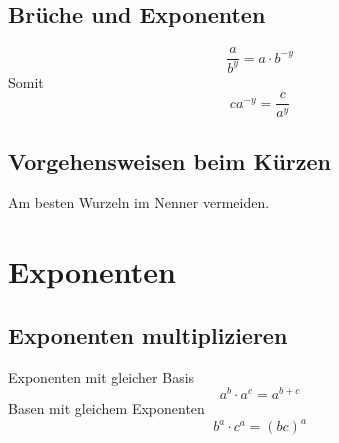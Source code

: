 \documentclass[11pt, a4paper]{article}
\begin{document}
\subsection{Brüche und Exponenten}
\[
	\frac{a}{b^{y}} = a \cdot b^{-y}
\]
Somit
\[
	ca^{-y} = \frac{c}{a^{y}}
\]

\subsection{Vorgehensweisen beim Kürzen}
Am besten Wurzeln im Nenner vermeiden.\\
\section{Exponenten}
\subsection{Exponenten multiplizieren}
Exponenten mit gleicher Basis
\[
	a^{b} \cdot a^{c} = a^{b + c}
\]
Basen mit gleichem Exponenten
\[
	b^{a} \cdot c^{a} = (bc)^{a}
\]
\end{document}
